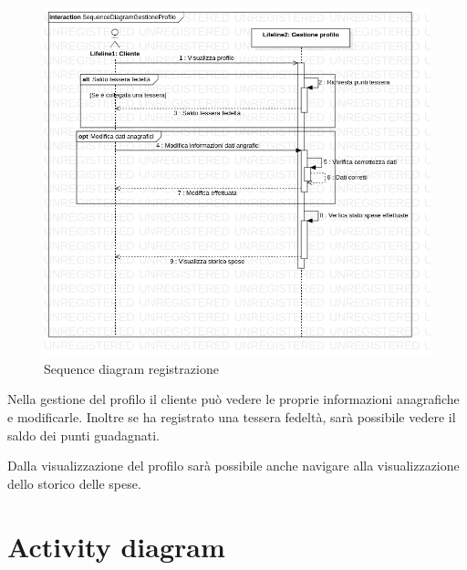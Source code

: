 \documentclass[12pt, a4paper]{article}
\numberwithin{equation}{section} %
\begin{document}
\begin{figure}[ht]
\centering
\includegraphics[width=\textwidth]{Use Case Model!Gestione profilo!InteractionGestioneProfilo!SequenceDiagramGestioneProfilo_5.png}
\caption{Sequence diagram registrazione}
\end{figure}

Nella gestione del profilo il cliente può vedere le proprie informazioni 
anagrafiche e modificarle. Inoltre se ha registrato una tessera fedeltà, sarà
possibile vedere il saldo dei punti guadagnati.

Dalla visualizzazione del profilo sarà possibile anche navigare alla
visualizzazione dello storico delle spese.

\newpage

\section{Activity diagram}

\end{document}
